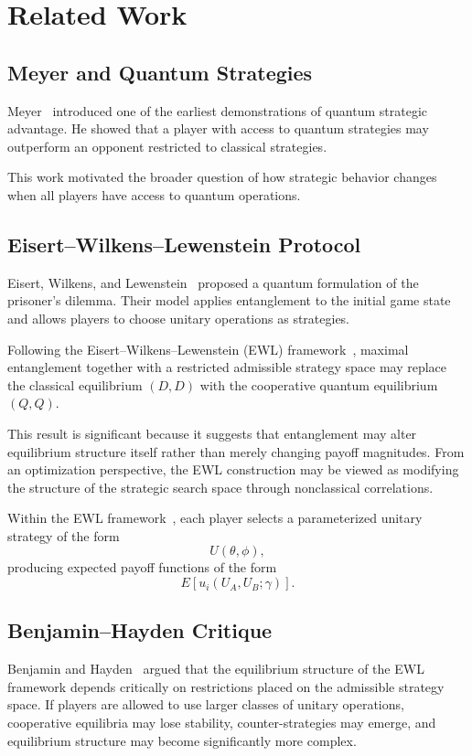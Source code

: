 \section{Related Work}

\subsection{Meyer and Quantum Strategies}

Meyer~\cite{meyer} introduced one of the earliest demonstrations of quantum strategic advantage. He showed that a player with access to quantum strategies may outperform an opponent restricted to classical strategies.

This work motivated the broader question of how strategic behavior changes when all players have access to quantum operations.

\subsection{Eisert--Wilkens--Lewenstein Protocol}

Eisert, Wilkens, and Lewenstein~\cite{ewl} proposed a quantum formulation of the prisoner's dilemma. Their model applies entanglement to the initial game state and allows players to choose unitary operations as strategies.

Following the Eisert--Wilkens--Lewenstein (EWL) framework~\cite{ewl}, maximal entanglement together with a restricted admissible strategy space may replace the classical equilibrium $(D,D)$ with the cooperative quantum equilibrium $(Q,Q)$.

This result is significant because it suggests that entanglement may alter equilibrium structure itself rather than merely changing payoff magnitudes. From an optimization perspective, the EWL construction may be viewed as modifying the structure of the strategic search space through nonclassical correlations.

Within the EWL framework~\cite{ewl,sutton}, each player selects a parameterized unitary strategy of the form
\[
U(\theta,\phi),
\]
producing expected payoff functions of the form
\[
E[u_i(U_A,U_B;\gamma)].
\]

\subsection{Benjamin--Hayden Critique}

Benjamin and Hayden~\cite{benjamin} argued that the equilibrium structure of the EWL framework depends critically on restrictions placed on the admissible strategy
space. If players are allowed to use larger classes of unitary operations, cooperative equilibria may lose stability, counter-strategies may emerge, and equilibrium structure may become significantly more complex.

